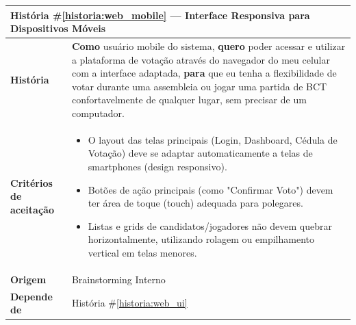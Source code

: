 \documentclass[12pt,a4paper]{article}
\newcounter{historia}
\begin{document}
\label{historia:web_mobile}
\begin{table}[H]
    \centering
    \begin{tabular}{|m{4.5cm} | m{11cm}|}
    \hline
    \multicolumn{2}{|l|}{\textbf{História \#\ref{historia:web_mobile} --- Interface Responsiva para Dispositivos Móveis}} \\
    \hline  \textbf{História} &
    \textbf{Como} usuário mobile do sistema, \newline
    \textbf{quero} poder acessar e utilizar a plataforma de votação através do navegador do meu celular com a interface adaptada,\newline  
    \textbf{para} que eu tenha a flexibilidade de votar durante uma assembleia ou jogar uma partida de BCT confortavelmente de qualquer lugar, sem precisar de um computador. \\
    \textbf{Critérios de aceitação} &
    \begin{itemize}
        \item{O layout das telas principais (Login, Dashboard, Cédula de Votação) deve se adaptar automaticamente a telas de smartphones (design responsivo).}
        \item{Botões de ação principais (como "Confirmar Voto") devem ter área de toque (touch) adequada para polegares.}
        \item{Listas e grids de candidatos/jogadores não devem quebrar horizontalmente, utilizando rolagem ou empilhamento vertical em telas menores.}
    \end{itemize}\\
    \textbf{Origem}& Brainstorming Interno\\
    \textbf{Depende de}& História \#\ref{historia:web_ui} \\
    \hline
    \end{tabular}
\end{table}

\vspace{0.5cm}
\end{document}
